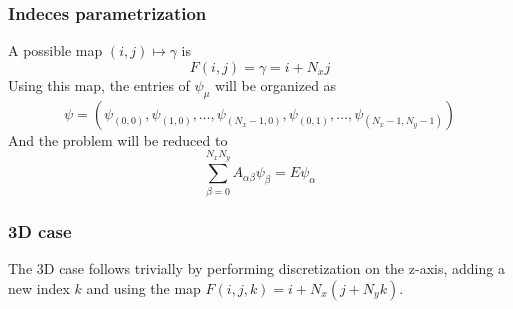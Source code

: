 \documentclass{article}
\begin{document}
\subsubsection{Indeces parametrization}
A possible map $(i, j) \mapsto \gamma$ is
\begin{equation}
F(i, j) = \gamma = i + N_x j \label{eq:indeces_parametrization}
\end{equation}
Using this map, the entries of $\psi_\mu$ will be organized as 
\begin{equation}
\psi = (\psi_{(0, 0)}, \psi_{(1, 0)}, \ldots, \psi_{(N_x-1, 0)}, \psi_{(0, 1)}, \ldots, \psi_{(N_x-1, N_y-1)})
\end{equation}
And the problem will be reduced to 
\begin{equation}
\sum_{\beta=0}^{N_x N_y}A_{\alpha\beta}\psi_{\beta} = E\psi_\alpha
\end{equation}

\subsubsection{3D case}
The 3D case follows trivially by performing discretization on the z-axis, adding a new index $k$ and using the map $F(i, j, k) = i + N_x (j + N_y k)$.
\end{document}
